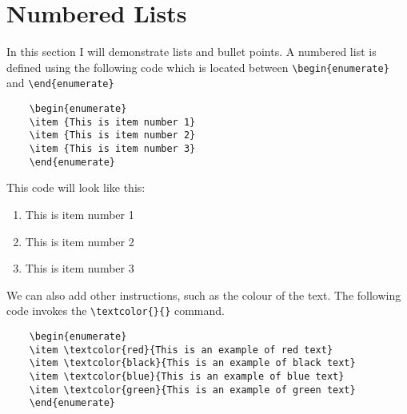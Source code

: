 
\section{Numbered Lists}

In this section I will demonstrate lists and bullet points. A numbered list is defined using the following code which is located between \verb|\begin{enumerate}| and \verb|\end{enumerate}|

\small

\begin{verbatim}
    \begin{enumerate}
    \item {This is item number 1}
    \item {This is item number 2}
    \item {This is item number 3}
    \end{enumerate}
\end{verbatim}

This code will look like this:

    \begin{enumerate}
    \item {This is item number 1}
    \item {This is item number 2}
    \item {This is item number 3}
    \end{enumerate}

We can also add other instructions, such as the colour of the text. The following code invokes the \verb|\textcolor{}{}| command. 

\begin{verbatim}
    \begin{enumerate}
    \item \textcolor{red}{This is an example of red text}
    \item \textcolor{black}{This is an example of black text}
    \item \textcolor{blue}{This is an example of blue text}
    \item \textcolor{green}{This is an example of green text}
    \end{enumerate}
\end{verbatim}
 
